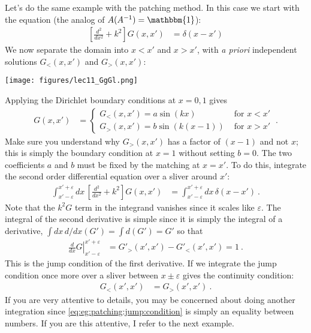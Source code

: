 \begin{example}\label{ex:patching:eg}
Let's do the same example with the patching method. In this case we start with the equation (the analog of $A(A^{-1}) =\mathbbm{1}$):
\begin{align}
	\left[\frac{d^2}{dx^2} + k^2\right]G(x,x') &= \delta(x-x')
\end{align}
We now separate the domain into $x<x'$ and $x>x'$, with \emph{a priori} independent solutions $G_<(x,x')$ and $G_>(x,x')$:
\begin{center}
\texttt{[image: figures/lec11\_GgGl.png]}
\end{center}
Applying the Dirichlet boundary conditions at $x=0,1$ gives
\begin{align}
	G(x,x') &=
	\begin{cases}
	G_<(x,x') = a\sin(kx) & \text{ for } x < x'\\
	G_>(x,x') = b\sin\left(k(x-1)\right) & \text{ for } x > x'
	\end{cases} \ .
\end{align}
Make sure you understand why $G_>(x,x')$ has a factor of $(x-1)$ and not $x$; this is simply the boundary condition at $x=1$ without setting $b=0$.
The two coefficients $a$ and $b$ must be fixed by the matching at $x=x'$. 
To do this, integrate the second order differential equation over a sliver around $x'$:
\begin{align}
	\int_{x'-\varepsilon}^{x'+\varepsilon}
	dx \, 
	\left[
	 \frac{d^2}{dx^2} + k^2
	\right]
	G(x,x')
	&=
	\int_{x'-\varepsilon}^{x'+\varepsilon} dx\, \delta (x-x') \ .
	\label{eq:eg:jump:condition:integration:eg:1}
\end{align}
Note that the $k^2 G$ term in the integrand vanishes since it scales like $\varepsilon$. The integral of the second derivative is simple since it is simply the integral of a derivative, $\int dx\, d/dx(G') = \int d(G') = G'$ so that
\begin{align}
	\left.\frac{d}{dx}G\right|_{x'-\varepsilon}^{x'+\varepsilon}
	&=
	G'_>(x',x') - G'_<(x',x')
	=
	 1 \ .
	 \label{eq:eg:patching:jump:condition}
\end{align}
This is the jump condition of the first derivative. If we integrate the jump condition once more over a sliver between $x\pm\varepsilon$ gives the continuity condition:
\begin{align}
	G_<(x',x') &= G_>(x',x') \ .
\end{align}
If you are very attentive to details, you may be concerned about doing another integration since \eqref{eq:eg:patching:jump:condition} is simply an equality between numbers. If you are this attentive, I refer to the next example.

\end{example}
